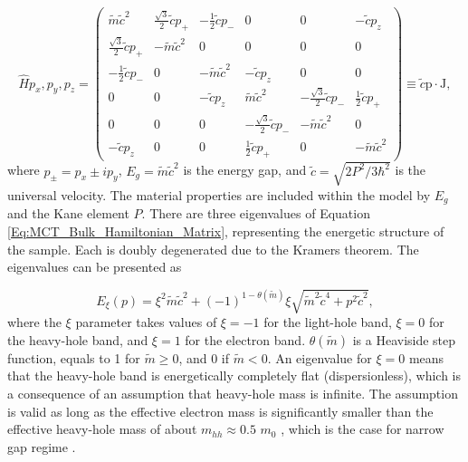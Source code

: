 \documentclass[titlepage,a4paper]{book}
\begin{document}
\begin{equation}
\label{Eq:MCT_Bulk_Hamiltonian_Matrix}
\hat{H}{p_x, p_y, p_z} = \left( \begin{array}{cccccc}
\tilde{m}\tilde{c}^2 & \frac{\sqrt{3}}{2}\tilde{c}{p_+} & -\frac{1}{2}\tilde{c}{p_{-}} & 0 & 0 & -\tilde{c}p_z \\
\frac{\sqrt{3}}{2}\tilde{c}{p_+} & -\tilde{m}\tilde{c}^2 & 0 & 0 & 0 & 0 \\
-\frac{1}{2}\tilde{c}{p_-} & 0 & -\tilde{m}\tilde{c}^2 & -\tilde{c}p_z & 0 & 0 \\
0 & 0 & -\tilde{c}p_z & \tilde{m}\tilde{c}^2 & -\frac{\sqrt{3}}{2}\tilde{c}{p_-} & \frac{1}{2}\tilde{c}{p_+} \\
0 & 0 & 0 & -\frac{\sqrt{3}}{2}\tilde{c}{p_-} & -\tilde{m}\tilde{c}^2 &0 \\
-\tilde{c}p_z & 0 & 0 & \frac{1}{2}\tilde{c}{p_+} & 0 & -\tilde{m}\tilde{c}^2 \end{array} \right) \equiv \tilde{c}\boldsymbol{\mathrm{p}} \cdot \boldsymbol{\mathrm{J}},
\end{equation}
where $p_{\pm} = p_x \pm ip_y$, $E_g = \tilde{m}\tilde{c}^2$ is the energy gap, and $\tilde{c} = \sqrt{2P^2 / 3 \hbar^2}$ is the universal velocity. The material properties are included within the model by $E_g$ and the Kane element $P$. There are three eigenvalues of Equation \ref{Eq:MCT_Bulk_Hamiltonian_Matrix}, representing the energetic structure of the sample. Each is doubly degenerated due to the Kramers theorem. The eigenvalues can be presented as

\begin{equation}
\label{Eq:MCT_eigenvalues}
E_\xi (p) = \xi^2 \tilde{m}\tilde{c}^2 + (-1)^{1-\theta (\tilde{m})} \xi \sqrt{\tilde{m}^2\tilde{c}^4 + p^2\tilde{c}^2},
\end{equation}
where the $\xi$ parameter takes values of $\xi = -1$ for the light-hole band, $\xi = 0$ for the heavy-hole band, and $\xi = 1$ for the electron band. $\theta(\tilde{m})$ is a Heaviside step function, equals to 1 for $\tilde{m} \geq 0$, and 0 if $\tilde{m} < 0$. An eigenvalue for $\xi = 0$ means that the heavy-hole band is energetically completely flat (dispersionless), which is a consequence of an assumption that heavy-hole mass is infinite. The assumption is valid as long as the effective electron mass is significantly smaller than the effective heavy-hole mass of about $m_{hh} \approx 0.5$ $m_0$ \cite{Weiler_MCT}, which is the case for narrow gap regime \cite{Orlita_MCT}. 
\end{document}
